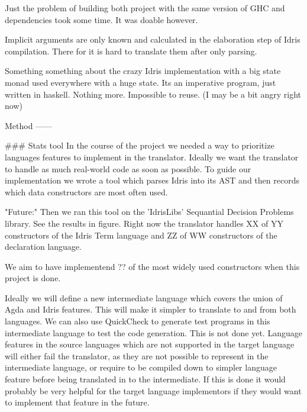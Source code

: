 \documentclass[parskip=half]{scrartcl}
\begin{document}
Just the problem of building both project with the same version of GHC and
dependencies took some time. It was doable however.

Implicit arguments are only known and calculated in the elaboration step of
Idris compilation. There for it is hard to translate them after only parsing.

Something something about the crazy Idris implementation with a big state monad
used everywhere with a huge state. Its an imperative program, just written in
haskell. Nothing more. Impossible to reuse. (I may be a bit angry right now)


Method
------

### Stats tool
In the course of the project we needed a way to prioritize languages features
to implement in the translator. Ideally we want the translator to handle
as much real-world code as soon as possible. To guide our implementation we
wrote a tool which parses Idris into its AST and then records which data
constructors are most often used.

"Future:" Then we ran this tool on the 'IdrisLibs' Sequantial Decision
Problems library. See the results in figure. Right now the translator handles
XX of YY constructors of the Idris Term language and ZZ of WW constructors of
the declaration language.

We aim to have implementend ?? of the most widely used constructors when this
project is done.


Ideally we will define a new intermediate language which covers the union of
Agda and Idris features. This will make it simpler to translate to and from
both languages. We can also use QuickCheck to generate test programs in this
intermediate language to test the code generation. This is not done yet.
Language features in the source languages which are not supported in the target
language will either fail the translator, as they are not possible to represent
in the intermediate language, or require to be compiled down to simpler
language feature before being translated in to the intermediate. If this is
done it would probably be very helpful for the target language implementors if
they would want to implement that feature in the future.




\end{document}
